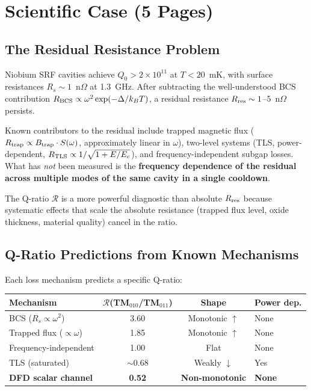 \documentclass[11pt]{article}
\newcommand{\Rq}{\mathcal{R}}
\begin{document}
\section{Scientific Case (5 Pages)}
\label{sec:science}

\subsection{The Residual Resistance Problem}

Niobium SRF cavities achieve $Q_0 > 2 \times 10^{11}$ at $T < 20$~mK,
with surface resistances $R_s \sim 1$~n$\Omega$ at 1.3~GHz. After
subtracting the well-understood BCS contribution
$R_{\rm BCS} \propto \omega^2 \exp(-\Delta/k_BT)$, a residual
resistance $R_{\rm res} \sim 1$--$5$~n$\Omega$ persists.

Known contributors to the residual include trapped magnetic flux
($R_{\rm trap} \propto B_{\rm trap} \cdot S(\omega)$, approximately
linear in $\omega$), two-level systems (TLS, power-dependent,
$R_{\rm TLS} \propto 1/\sqrt{1+E/E_c}$), and frequency-independent
subgap losses. What has \emph{not} been measured is the
\textbf{frequency dependence of the residual across multiple modes
of the same cavity in a single cooldown}.

The Q-ratio $\Rq$ is a more powerful diagnostic than absolute
$R_{\rm res}$ because systematic effects that scale the absolute
resistance (trapped flux level, oxide thickness, material quality)
cancel in the ratio.

\subsection{Q-Ratio Predictions from Known Mechanisms}

Each loss mechanism predicts a specific Q-ratio:

\begin{center}
\renewcommand{\arraystretch}{1.2}
\begin{tabular}{@{}lccl@{}}
\toprule
\textbf{Mechanism} & $\Rq$(TM$_{010}$/TM$_{011}$) & \textbf{Shape} &
\textbf{Power dep.} \\
\midrule
BCS ($R_s \propto \omega^2$) & 3.60 & Monotonic $\uparrow$ & None \\
Trapped flux ($\propto \omega$) & 1.85 & Monotonic $\uparrow$ & None \\
Frequency-independent & 1.00 & Flat & None \\
TLS (saturated) & $\sim$0.68 & Weakly $\downarrow$ & Yes \\
\midrule
\textbf{DFD scalar channel} & \textbf{0.52} & \textbf{Non-monotonic} &
\textbf{None} \\
\bottomrule
\end{tabular}
\end{center}
\end{document}
